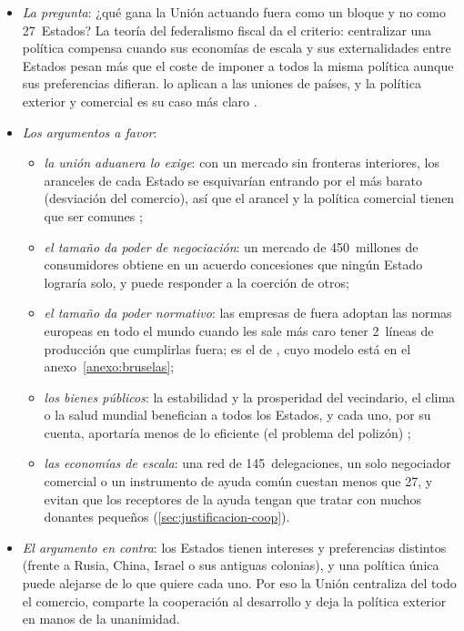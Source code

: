 \documentclass[11pt]{article}
\begin{document}
\begin{itemize}
\item \emph{La pregunta}: ¿qué gana la Unión actuando fuera como un bloque y no como 27~Estados? La teoría del federalismo fiscal da el criterio: centralizar una política compensa cuando sus economías de escala y sus externalidades entre Estados pesan más que el coste de imponer a todos la misma política aunque sus preferencias difieran\nocite{Oates1972Fiscal}. \textcite{AlesinaAngeloniEtro2005} lo aplican a las uniones de países, y la política exterior y comercial es su caso más claro .
\item \emph{Los argumentos a favor}:
  \begin{itemize}
  \item \emph{la unión aduanera lo exige}: con un mercado sin fronteras interiores, los aranceles de cada Estado se esquivarían entrando por el más barato (desviación del comercio), así que el arancel y la política comercial tienen que ser comunes ;
  \item \emph{el tamaño da poder de negociación}: un mercado de 450~millones de consumidores obtiene en un acuerdo concesiones que ningún Estado lograría solo, y puede responder a la coerción de otros\nocite{BancoMundial2026PIB};
  \item \emph{el tamaño da poder normativo}: las empresas de fuera adoptan las normas europeas en todo el mundo cuando les sale más caro tener 2~líneas de producción que cumplirlas fuera; es el  de \textcite{Bradford2012Brussels}, cuyo modelo está en el anexo~\ref{anexo:bruselas};
  \item \emph{los bienes públicos}: la estabilidad y la prosperidad del vecindario, el clima o la salud mundial benefician a todos los Estados, y cada uno, por su cuenta, aportaría menos de lo eficiente (el problema del polizón) ;
  \item \emph{las economías de escala}: una red de 145~delegaciones, un solo negociador comercial o un instrumento de ayuda común cuestan menos que 27, y evitan que los receptores de la ayuda tengan que tratar con muchos donantes pequeños (\ref{sec:justificacion-coop}).
  \end{itemize}
\item \emph{El argumento en contra}: los Estados tienen intereses y preferencias distintos (frente a Rusia, China, Israel o sus antiguas colonias), y una política única puede alejarse de lo que quiere cada uno. Por eso la Unión centraliza del todo el comercio, comparte la cooperación al desarrollo y deja la política exterior en manos de la unanimidad.
\end{itemize}
\end{document}
